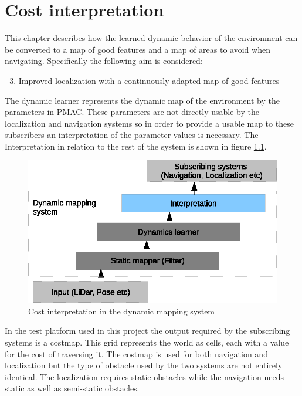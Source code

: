 \chapter{Cost interpretation}
This chapter describes how the learned dynamic behavior of the environment can be converted to a map of good features and a map of areas to avoid when navigating. Specifically the following aim is considered:

\begin{enumerate}
    \setcounter{enumi}{2}
    \item Improved localization with a continuously adapted map of good features
\end{enumerate}

The dynamic learner represents the dynamic map of the environment by the parameters in PMAC. These parameters are not directly usable by the localization and navigation systems so in order to provide a usable map to these subscribers an interpretation of the parameter values is necessary. The Interpretation in relation to the rest of the system is shown in figure \ref{fig:cost_overview}.

\begin{figure}[htbp]
	\centering
	\includegraphics[scale=1]{chapters/cost_interpretation/figures/cost_overview.eps}
	\caption{Cost interpretation in the dynamic mapping system}
	\label{fig:cost_overview}
\end{figure}

In the test platform used in this project the output required by the subscribing systems is a costmap. This grid represents the world as cells, each with a value for the cost of traversing it. 
The costmap is used for both navigation and localization but the type of obstacle used by the two systems are not entirely identical. The localization requires static obstacles while the navigation needs static as well as semi-static obstacles. 







